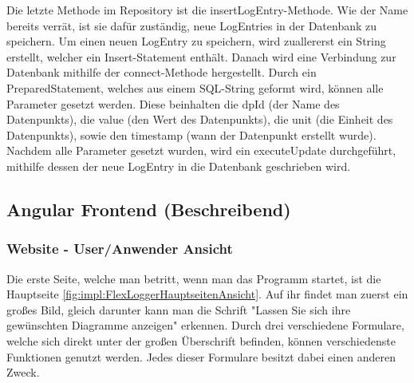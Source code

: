 Die letzte Methode im Repository ist die insertLogEntry-Methode. Wie der Name bereits verrät, ist sie dafür zuständig, neue LogEntries in der Datenbank zu speichern. Um einen neuen LogEntry zu speichern, wird zuallererst ein String erstellt, welcher ein Insert-Statement enthält.
Danach wird eine Verbindung zur Datenbank mithilfe der connect-Methode hergestellt. Durch ein PreparedStatement, welches aus einem SQL-String geformt wird, können alle Parameter gesetzt werden. Diese beinhalten die dpId (der Name des Datenpunkts), die value (den Wert des Datenpunkts), die unit (die Einheit des Datenpunkts), sowie den timestamp (wann der Datenpunkt erstellt wurde). Nachdem alle Parameter gesetzt wurden, wird ein executeUpdate durchgeführt, mithilfe dessen der neue LogEntry in die Datenbank geschrieben wird.
 
\subsection{Angular Frontend (Beschreibend)}
 
 
 
\subsubsection{Website - User/Anwender Ansicht}
Die erste Seite, welche man betritt, wenn man das Programm startet, ist die Hauptseite \ref{fig:impl:FlexLoggerHauptseitenAnsicht}. Auf ihr findet man zuerst ein großes Bild, gleich darunter kann man die Schrift "Lassen Sie sich ihre gewünschten Diagramme anzeigen" erkennen.
Durch drei verschiedene Formulare, welche sich direkt unter der großen Überschrift befinden, können verschiedenste Funktionen genutzt werden. Jedes dieser Formulare besitzt dabei einen anderen Zweck.
 
